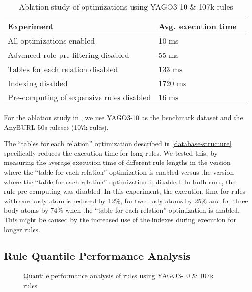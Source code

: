 \documentclass[english]{lni}
\begin{document}
\begin{table}[t]
\centering
\begin{tabular}{lll}
\toprule
Experiment & Avg. execution time \\
\midrule
All optimizations enabled & 10 ms\\
\midrule
Advanced rule pre-filtering disabled & 55 ms\\
Tables for each relation disabled & 133 ms\\
Indexing disabled & 1720 ms\\
Pre-computing of expensive rules disabled & 16 ms\\

\bottomrule
\end{tabular}
\caption{Ablation study of optimizations using YAGO3-10 \& 107k rules}
\label{tab:ablation}
\end{table}


For the ablation study in , we use YAGO3-10 as the benchmark dataset and the AnyBURL 50s ruleset (107k rules).

The “tables for each relation” optimization described in \ref{database-structure} specifically reduces the execution time for long rules. We tested this, by measuring the average execution time of different rule lengths in the version where the “table for each relation” optimization is enabled versus the version where the “table for each relation” optimization is disabled. In both runs, the rule pre-computing was disabled. In this experiment, the execution time for rules with one body atom is reduced by 12\%, for two body atoms by 25\% and for three body atoms by 74\% when the “table for each relation” optimization is enabled. This might be caused by the increased use of the indexes during execution for longer rules.

\subsection{Rule Quantile Performance Analysis} 

\begin{figure}[t]
\caption{Quantile performance analysis of rules using YAGO3-10 \& 107k rules}
\label{fig:quantile-analysis}
\end{figure}
\end{document}
